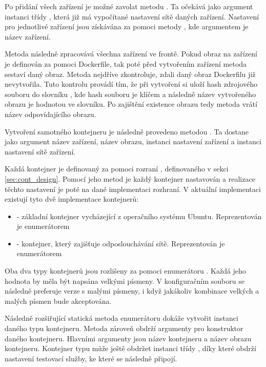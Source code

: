 Po přidání všech zařízení je možné zavolat metodu . Ta očekává jako argument instanci třídy , která již má vypočítané nastavení sítě daných zařízení. Nastavení pro jednotlivé zařízení jsou získávána za pomoci metody , kde argumentem je název zařízení. 

Metoda  následně zpracovává všechna zařízení ve frontě. Pokud obraz na zařízení je definován za pomoci Dockerfile, tak poté před vytvořením zařízení metoda  sestaví daný obraz. Metoda nejdříve zkontroluje, zdali daný obraz Dockerfilu již nevytvořila. Tuto kontrolu provádí tím, že při vytvoření si uloží hash zdrojového souboru do slovníku , kde hash souboru je klíčem a následně název vytvořeného obrazu je hodnotou ve slovníku. Po zajištění existence obrazu tedy metoda  vrátí název odpovídajícího obrazu. 

Vytvoření samotného kontejneru je následně provedeno metodou . Ta dostane jako argument název zařízení, název obrazu, instanci nastavení zařízení a instanci nastavení sítě zařízení. 

Každá kontejner je definovaný za pomoci rozraní , definovaného v sekci \ref{sec:cont_design}. Pomocí jeho metod je každý kontejner nastavován a realizace těchto nastavení je poté na dané implementaci rozhraní. V aktuální implementaci existují tyto dvě implementace kontejnerů: 

\begin{itemize}
    \item {} - základní kontejner vycházející z operačního systému Ubuntu. Reprezentován je enumerátorem  
    \item {} - kontejner, který zajišťuje odposlouchávání sítě. Reprezentován je enumerátorem 
\end{itemize}

Oba dva typy kontejnerů jsou rozlišeny za pomoci enumerátoru . Každá jeho hodnota by měla být napsána velkými písmeny. V konfiguračním souboru se následně preferuje verze s malými písmeny, i když jakákoliv kombinace velkých a malých písmen bude akceptována. 

Následně rozšiřující statická metoda enumerátoru  dokáže vytvořit instanci daného typu kontejneru. Metoda zároveň obdrží argumenty pro konstruktor daného kontejneru. Hlavními argumenty jsou název kontejneru a název obrazu kontejneru. Kontejner typu  může ještě obdržet instanci třídy , díky které obdrží nastavení testovací služby, ke které se následně připojí. 

